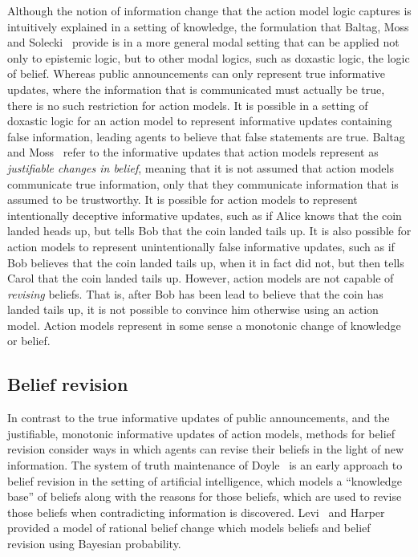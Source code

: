 Although the notion of information change that the action model logic captures
is intuitively explained in a setting of knowledge, the formulation that Baltag,
Moss and Solecki~\cite{baltag:1998} provide is in a more general modal setting
that can be applied not only to epistemic logic, but to other modal logics, such
as doxastic logic, the logic of belief. Whereas public announcements can only
represent true informative updates, where the information that is communicated
must actually be true, there is no such restriction for action models. It is
possible in a setting of doxastic logic for an action model to represent
informative updates containing false information, leading agents to believe that
false statements are true. Baltag and Moss~\cite{baltag:2004} refer to the
informative updates that action models represent as {\em justifiable changes in
belief}, meaning that it is not assumed that action models communicate true
information, only that they communicate information that is assumed to be
trustworthy. It is possible for action models to represent intentionally
deceptive informative updates, such as if Alice knows that the coin landed heads
up, but tells Bob that the coin landed tails up. It is also possible for action
models to represent unintentionally false informative updates, such as if Bob
believes that the coin landed tails up, when it in fact did not, but then tells
Carol that the coin landed tails up.  However, action models are not capable of
{\em revising} beliefs. That is, after Bob has been lead to believe that the
coin has landed tails up, it is not possible to convince him otherwise using an
action model. Action models represent in some sense a monotonic change of
knowledge or belief.

\subsection{Belief revision}

In contrast to the true informative updates of public announcements, and the
justifiable, monotonic informative updates of action models, methods for belief
revision consider ways in which agents can revise their beliefs in the light of
new information. The system of truth maintenance of Doyle~\cite{doyle:1979} is an
early approach to belief revision in the setting of artificial intelligence,
which models a ``knowledge base'' of beliefs along with the reasons for those
beliefs, which are used to revise those beliefs when contradicting information
is discovered.  Levi~\cite{levi:1983} and Harper~\cite{harper:1976} provided a
model of rational belief change which models beliefs and belief revision using
Bayesian probability.


